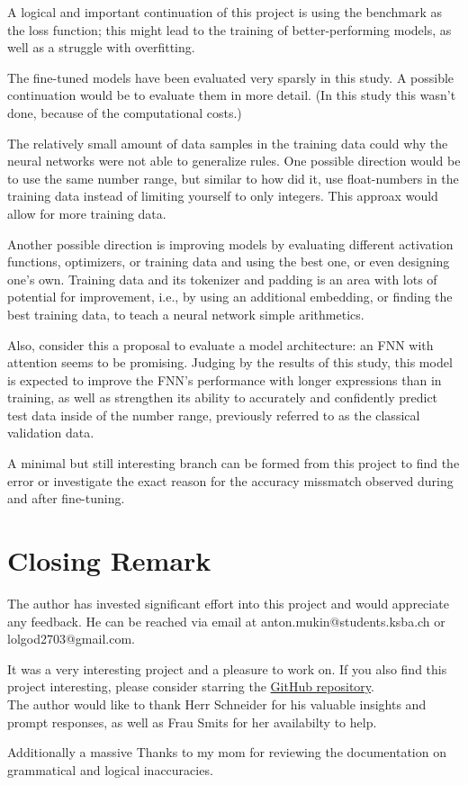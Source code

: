 \documentclass{article}
\begin{document}
\begin{description}
    \item A logical and important continuation of this project is using the benchmark as the loss function; this might lead to the training of better-performing models, as well as a struggle with overfitting. 
    \item The fine-tuned models have been evaluated very sparsly in this study. A possible continuation would be to evaluate them in more detail. (In this study this wasn't done, because of the computational costs.)
    \item The relatively small amount of data samples in the training data could why the neural networks were not able to generalize rules. One possible direction would be to use the same number range, but similar to how \cite{trask2018neuralarithmeticlogicunits} did it, use float-numbers in the training data instead of limiting yourself to only integers. This approax would allow for more training data.
    \item Another possible direction is improving models by evaluating different activation functions, optimizers, or training data and using the best one, or even designing one's own. Training data and its tokenizer and padding is an area with lots of potential for improvement, i.e., by using an additional embedding, or finding the best training data, to teach a neural network simple arithmetics. 
    \item Also, consider this a proposal to evaluate a model architecture: an FNN with attention seems to be promising. Judging by the results of this study, this model is expected to improve the FNN's performance with longer expressions than in training, as well as strengthen its ability to accurately and confidently predict test data inside of the number range, previously referred to as the classical validation data.
    \item A minimal but still interesting branch can be formed from this project to find the error or investigate the exact reason for the accuracy missmatch observed during and after fine-tuning.

\end{description}

\section{Closing Remark}

The author has invested significant effort into this project and would appreciate any feedback. He can be reached via email at anton.mukin@students.ksba.ch or lolgod2703@gmail.com.

It was a very interesting project and a pleasure to work on.
If you also find this project interesting, please consider starring the \href{https://github.com/AntonStantan/matura/tree/main}{GitHub repository}.
\\[1em]
The author would like to thank Herr Schneider for his valuable insights and prompt responses, as well as Frau Smits for her availabilty to help. 

Additionally a massive Thanks to my mom for reviewing the documentation on grammatical and logical inaccuracies.


\newpage
\printbibliography[heading=bibintoc]
\end{document}

